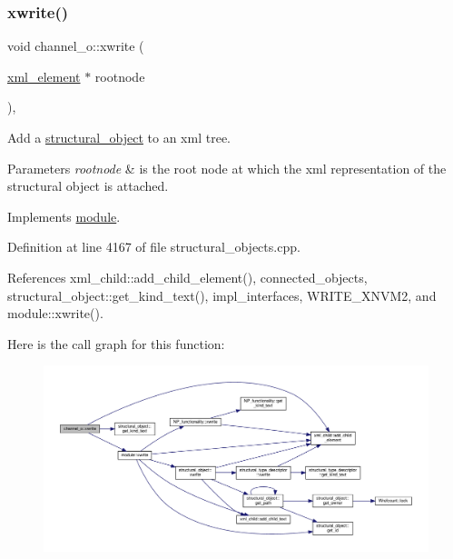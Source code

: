 \subsubsection{\texorpdfstring{xwrite()}{xwrite()}}
{\footnotesize\ttfamily void channel\+\_\+o\+::xwrite (\begin{DoxyParamCaption}\item[{\hyperlink{classxml__element}{xml\+\_\+element} $\ast$}]{rootnode }\end{DoxyParamCaption})\hspace{0.3cm}{\ttfamily [override]}, {\ttfamily [virtual]}}



Add a \hyperlink{classstructural__object}{structural\+\_\+object} to an xml tree. 


\begin{DoxyParams}{Parameters}
{\em rootnode} & is the root node at which the xml representation of the structural object is attached. \\
\hline
\end{DoxyParams}


Implements \hyperlink{classmodule_acd60f65d5beaeed8a6728ea1cb506b74}{module}.



Definition at line 4167 of file structural\+\_\+objects.\+cpp.



References xml\+\_\+child\+::add\+\_\+child\+\_\+element(), connected\+\_\+objects, structural\+\_\+object\+::get\+\_\+kind\+\_\+text(), impl\+\_\+interfaces, W\+R\+I\+T\+E\+\_\+\+X\+N\+V\+M2, and module\+::xwrite().

Here is the call graph for this function\+:
\nopagebreak
\begin{figure}[H]
\begin{center}
\leavevmode
\includegraphics[width=350pt]{d3/d41/classchannel__o_aa9272c96bee02d7ef08ef3d589725a6d_cgraph}
\end{center}
\end{figure}


